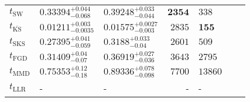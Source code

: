 \begin{tabular}{l|llr|llr}
	\midrule
	$t_{\mathrm{SW}}$ & $0.33394_{-0.068}^{+0.044}$ & $0.39248_{-0.044}^{+0.033}$ & ${\mathbf{2354}}$ & $338$ \\
	$t_{\overline{\mathrm{KS}}}$ & ${\mathbf{0.01211_{-0.0035}^{+0.003}}}$ & ${\mathbf{0.01575_{-0.003}^{+0.0027}}}$ & $2835$ & ${\mathbf{155}}$ \\
	$t_{\mathrm{SKS}}$ & $0.27395_{-0.059}^{+0.041}$ & $0.3188_{-0.04}^{+0.033}$ & $2601$ & $509$ \\
	$t_{\mathrm{FGD}}$ & $0.31409_{-0.07}^{+0.04}$ & $0.36919_{-0.036}^{+0.027}$ & $3643$ & $2795$ \\
	$t_{\mathrm{MMD}}$ & $0.75353_{-0.18}^{+0.12}$ & $0.89336_{-0.098}^{+0.078}$ & $7700$ & $13860$ \\
	$t_{\mathrm{LLR}}$ & - & - & - & - \\
	\bottomrule
\end{tabular}